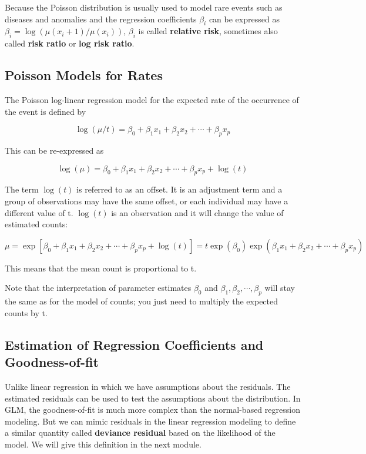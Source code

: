\documentclass[
]{book}
\begin{document}
Because the Poisson distribution is usually used to model rare events such as diseases and anomalies and the regression coefficients \(\beta_i\) can be expressed as \(\beta_i = \log (\mu(x_i+1)/\mu(x_i))\), \(\beta_i\) is called \textbf{relative risk}, sometimes also called \textbf{risk ratio} or \textbf{log risk ratio}.

\hypertarget{poisson-models-for-rates}{%
\subsection{Poisson Models for Rates}\label{poisson-models-for-rates}}

The Poisson log-linear regression model for the expected rate of the occurrence of the event is defined by

\[
\log(\mu/t) = \beta_0 + \beta_1 x_1 + \beta_2 x_2 + \cdots + \beta_p x_p
\]

This can be re-expressed as

\[
\log(\mu)=\beta_0 + \beta_1 x_1 + \beta_2 x_2 + \cdots + \beta_p x_p+\log(t)
\]

The term \(\log(t)\) is referred to as an offset. It is an adjustment term and a group of observations may have the same offset, or each individual may have a different value of t. \(\log(t)\) is an observation and it will change the value of estimated counts:

\[
\mu=\exp[\beta_0 + \beta_1 x_1 + \beta_2 x_2 + \cdots + \beta_p x_p+\log(t)]
= t\exp(\beta_0)\exp(\beta_1 x_1 + \beta_2 x_2 + \cdots + \beta_p x_p)
\]

This means that the mean count is proportional to t.

Note that the interpretation of parameter estimates \(\beta_0\) and \(\beta_1, \beta_2, \cdots, \beta_p\) will stay the same as for the model of counts; you just need to multiply the expected counts by t.

\hypertarget{estimation-of-regression-coefficients-and-goodness-of-fit}{%
\subsection{Estimation of Regression Coefficients and Goodness-of-fit}\label{estimation-of-regression-coefficients-and-goodness-of-fit}}

Unlike linear regression in which we have assumptions about the residuals. The estimated residuals can be used to test the assumptions about the distribution. In GLM, the goodness-of-fit is much more complex than the normal-based regression modeling. But we can mimic residuals in the linear regression modeling to define a similar quantity called \textbf{deviance residual} based on the likelihood of the model. We will give this definition in the next module.
\end{document}
